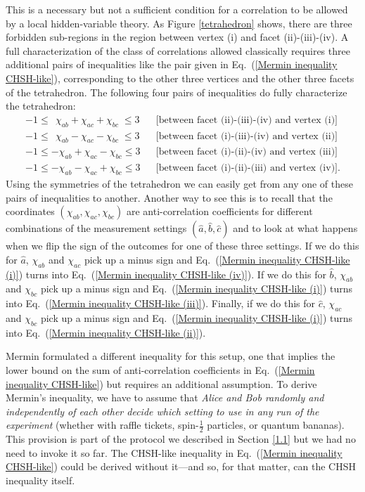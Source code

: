 This is a necessary but not a sufficient condition for a correlation to be allowed by a local hidden-variable theory. As Figure \ref{tetrahedron} shows, there are three forbidden sub-regions in the region between vertex (i) and facet (ii)-(iii)-(iv). A full characterization of the class of correlations allowed classically requires three additional pairs of inequalities like the pair given in Eq.\ (\ref{Mermin inequality CHSH-like}), corresponding to the other three vertices and the other three facets of the tetrahedron. The following four pairs of inequalities do fully characterize the tetrahedron:
\begin{eqnarray}
-1 \le \;\, \chi_{ab} + \chi_{ac} + \chi_{bc} \; \le 3  & \!\!\!\! & \textrm{[between facet (ii)-(iii)-(iv) and vertex (i)]} 
\label{Mermin inequality CHSH-like (i)} \\[.4cm]
-1 \le \;\, \chi_{ab} - \chi_{ac} - \chi_{bc} \; \le 3  & \!\!\!\!  & \textrm{[between facet (i)-(iii)-(iv) and vertex (ii)]}  
\label{Mermin inequality CHSH-like (ii)} \\[.4cm]
-1 \le - \chi_{ab} + \chi_{ac} - \chi_{bc} \le 3 & \!\!\!\!  & \textrm{[between facet (i)-(ii)-(iv) and vertex (iii)]} 
\label{Mermin inequality CHSH-like (iii)} \\[.4cm]
-1 \le - \chi_{ab} - \chi_{ac} + \chi_{bc} \le 3 & \!\!\!\!   & \textrm{[between facet (i)-(ii)-(iii) and vertex (iv)]}.
\label{Mermin inequality CHSH-like (iv)}
\end{eqnarray}
Using the symmetries of the tetrahedron we can easily get from any one of these pairs of inequalities to another.  Another way to see this is to recall that the coordinates $(\chi_{ab}, \chi_{ac}, \chi_{bc})$ are anti-correlation coefficients for different combinations of the measurement settings $(\hat{a}, \hat{b}, \hat{c})$ and to look at what happens when we flip the sign of the outcomes for one of these three settings. If we do this for $\hat{a}$, $\chi_{ab}$ and $\chi_{ac}$ pick up a minus sign and Eq.\ (\ref{Mermin inequality CHSH-like (i)}) turns into Eq.\ (\ref{Mermin inequality CHSH-like (iv)}). If we do this for $\hat{b}$, $\chi_{ab}$ and $\chi_{bc}$ pick up a minus sign and Eq.\ (\ref{Mermin inequality CHSH-like (i)}) turns into Eq.\ (\ref{Mermin inequality CHSH-like (iii)}). Finally, if we do this for $\hat{c}$, $\chi_{ac}$ and $\chi_{bc}$ pick up a minus sign and Eq.\ (\ref{Mermin inequality CHSH-like (i)}) turns into Eq.\ (\ref{Mermin inequality CHSH-like (ii)}).

Mermin formulated a different inequality for this setup, one that implies the lower bound on the sum of anti-correlation coefficients in Eq.\ (\ref{Mermin inequality CHSH-like}) but requires an additional assumption. To derive Mermin's inequality, we have to assume that \emph{Alice and Bob randomly and independently of each other decide which setting to use in any run of the experiment} (whether with raffle tickets, spin-$\frac12$ particles, or quantum bananas). This provision is part of the protocol we described in Section \ref{1.1} but we had no need to invoke it so far. The CHSH-like inequality in Eq.\ (\ref{Mermin inequality CHSH-like}) could be derived without it---and so, for that matter, can the CHSH inequality itself. 

